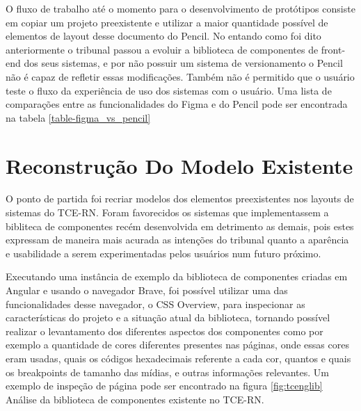 
O fluxo de trabalho até o momento para o desenvolvimento de protótipos consiste em copiar um projeto preexistente e utilizar a maior quantidade possível de elementos de layout desse documento do Pencil. No entando como foi dito anteriormente o tribunal passou a evoluir a biblioteca de componentes de front-end dos seus sistemas, e por não possuir um sistema de versionamento o Pencil não é capaz de refletir essas modificações. Também não é permitido que o usuário teste o fluxo da experiência de uso dos sistemas com o usuário. Uma lista de comparações entre as funcionalidades do Figma e do Pencil pode ser encontrada na tabela \ref{table-figma_vs_pencil}

\section{Reconstrução Do Modelo Existente} \label{secao32}

O ponto de partida foi recriar modelos dos elementos preexistentes nos layouts de sistemas do TCE-RN. Foram favorecidos os sistemas que implementassem a bibliteca de componentes recém desenvolvida em detrimento as demais, pois estes expressam de maneira mais acurada as intenções do tribunal quanto a aparência e usabilidade a serem experimentadas pelos usuários num futuro próximo.

Executando uma instância de exemplo da biblioteca de componentes criadas em Angular e usando o navegador Brave, foi possível utilizar uma das funcionalidades desse navegador, o CSS Overview, para inspecionar as características do projeto e a situação atual da biblioteca, tornando possível realizar o levantamento dos diferentes aspectos dos componentes como por exemplo a quantidade de cores diferentes presentes nas páginas, onde essas cores eram usadas, quais os códigos hexadecimais referente a cada cor, quantos e quais os breakpoints de tamanho das mídias, e outras informações relevantes. Um exemplo de inspeção de página pode ser encontrado na figura \ref{fig:tcenglib} Análise da biblioteca de componentes existente no TCE-RN.

